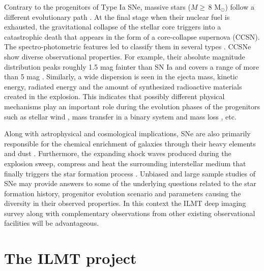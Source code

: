 \documentclass[useAMS,usenatbib]{mnras}
\begin{document}
Contrary to the progenitors of Type Ia SNe, massive stars ($M \ge\, $8 M$_{\odot}$) follow a different 
evolutionary path \citep[e.g.][]{1991ComAp..15..221B,2003ApJ...591..288H,Smartt2009,2012ARA&A..50..107L}.
At the final stage when their nuclear fuel is exhausted, the gravitational collapse of the stellar core 
triggers into a catastrophic death that appears in the form of a core-collapse supernova (CCSN).
The spectro-photometric features led to classify them in several types \citep[c.f. IIP, IIL, IIn, IIb, Ib, 
Ic and Ic-BL; see][for a review]{1941PASP...53..224M,1997ARA&A..35..309F}.
CCSNe show diverse observational properties.
For example, their absolute magnitude distribution peaks roughly 1.5 mag fainter than SN Ia and covers a 
range of more than 5 mag \citep{2002AJ....123..745R,2006AJ....131.2233R}. Similarly, a wide dispersion is 
seen in the ejecta mass, kinetic energy, radiated energy and the amount of synthesized radioactive materials 
created in the explosion. This indicates that possibly different physical mechanisms play an important role 
during the evolution phases of the progenitors such as stellar wind \citep*{2008A&ARv..16..209P}, mass 
transfer in a binary system \citep*{1985ApJ...294L..17W,1992ApJ...391..246P,2010ApJ...725..940Y,
2012Sci...337..444S} and mass loss \citep{2006ApJ...645L..45S,2014ARA&A..52..487S}, etc.


Along with astrophysical and cosmological implications, SNe are also primarily responsible for the 
chemical enrichment of galaxies through their heavy elements and dust \citep[e.g.][]{1986A&A...154..279M,
2001MNRAS.325..726T,2007MNRAS.378..973B}. Furthermore, the expanding shock waves produced during the 
explosion sweep, compress and heat the surrounding interstellar medium that finally triggers the star 
formation process \citep[e.g.][and references therein]{1977ApJ...217..473H,1998ASPC..148..150E}.
Unbiased and large sample studies of SNe may provide answers to some of the underlying questions 
related to the star formation history, progenitor evolution scenario and parameters causing the 
diversity in their observed properties. In this context the ILMT deep imaging survey along 
with complementary observations from other existing observational facilities will be advantageous.


\section{The ILMT project}\label{project}
\end{document}
